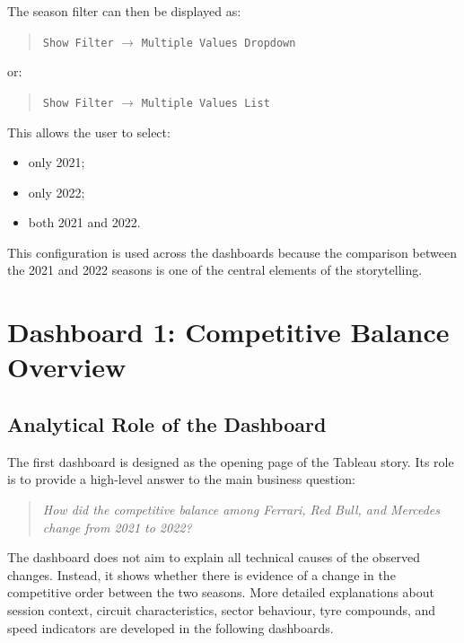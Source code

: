 \documentclass[12pt,a4paper]{article}
\begin{document}
	The season filter can then be displayed as:
	
	\begin{quote}
		\texttt{Show Filter} $\rightarrow$ \texttt{Multiple Values Dropdown}
	\end{quote}
	
	or:
	
	\begin{quote}
		\texttt{Show Filter} $\rightarrow$ \texttt{Multiple Values List}
	\end{quote}
	
	This allows the user to select:
	
	\begin{itemize}[leftmargin=1.2cm]
		\item only 2021;
		\item only 2022;
		\item both 2021 and 2022.
	\end{itemize}
	
	This configuration is used across the dashboards because the comparison between the 2021 and 2022 seasons is one of the central elements of the storytelling.
	
	\section{Dashboard 1: Competitive Balance Overview}
	
	\subsection{Analytical Role of the Dashboard}
	
	The first dashboard is designed as the opening page of the Tableau story.
	Its role is to provide a high-level answer to the main business question:
	
	\begin{quote}
		\textit{How did the competitive balance among Ferrari, Red Bull, and Mercedes change from 2021 to 2022?}
	\end{quote}
	
	The dashboard does not aim to explain all technical causes of the observed changes.
	Instead, it shows whether there is evidence of a change in the competitive order between the two seasons.
	More detailed explanations about session context, circuit characteristics, sector behaviour, tyre compounds, and speed indicators are developed in the following dashboards.
	
\end{document}
